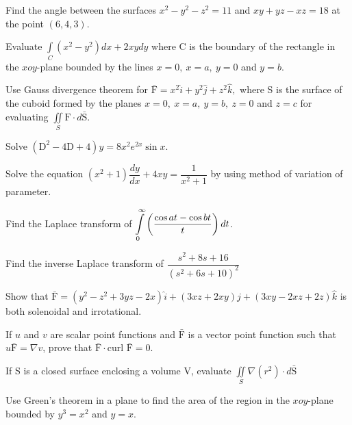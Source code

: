 \newpage \again
  
\item Find the angle between the surfaces $x^2 - y^2 - z^2 = 11$ and $xy + yz - xz = 18$ at the point $(6,4,3)$.
\item Evaluate $\int\limits_C (x^2-y^2) dx + 2xydy$ where C is the boundary of the rectangle in the $xoy$-plane
  bounded by the lines $x=0,\ x=a,\ y=0$ and $y=b$.\\
\item Use Gauss divergence theorem for $\bar{\text{F}}= x^2\hat{i} + y^2\hat{j} + z^2\hat{k},$
  where S is the surface of the cuboid
  formed by the planes $x=0,\ x=a,\ y=b,\ z=0$ and $z=c$ for evaluating $\iint\limits_S \text{F}\cdot
  d \bar{\text{S}}$.\\

\markB
\partC

\item 
\iitem Solve $(\text{D}^2 - 4\text{D} + 4)y = 8x^2  e^{2x}\sin x$.\\
\Or
\item Solve the equation $(x^2 + 1)\dfrac{dy}{dx} + 4xy = \dfrac{1}{x^2+1}$ by using method of
  variation of parameter.
\ene

\item \iitem Find the Laplace transform of $ \mathop\mathlarger{\int\limits_0^{\infty}}
  \left(\dfrac{\cos at - \cos bt}{t}\right)dt$.
\Or
\item Find the inverse Laplace transform of $\dfrac{s^2 + 8s + 16}{(s^2 + 6s+ 10)^2}$
\ene

\item \iitem  Show that $\bar{\text{F}} = (y^2 - z^2 + 3yz -2x)\hat{i} + (3xz +
  2xy)\hat{j} + (3xy - 2xz + 2z) \hat{k} $ is both solenoidal and irrotational.
\Or
\item If $u$ and $v$ are scalar point functions and $\bar{\text{F}}$ is a vector point function such that
  $u \bar{\text{F}} = \nabla v$, prove that $\bar{\text{F}}\cdot\text{curl } \bar{\text{F}} = 0$.
\ene

\item \iitem If S is a closed surface enclosing a volume V, evaluate
  $\displaystyle\iint\limits_{\!\!S} \nabla (r^2)\cdot d \bar{\text{S}}$
\Or
\item Use Green's theorem in a plane to find the area of the region in the $xoy$-plane bounded by
  $y^3 = x^2$ and $y=x$.
\ene

\markC
\ene

\newpage

